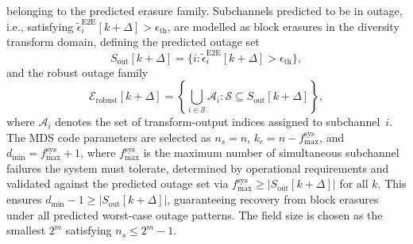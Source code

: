 \documentclass[lettersize,journal]{IEEEtran}
\begin{document}
belonging to the predicted erasure family. Subchannels predicted to 
be in outage, i.e., satisfying 
$\tilde{\epsilon}_{i}^{\mathrm{E2E}}[k+\Delta] > \epsilon_{\mathrm{th}}$, 
are modelled as block erasures in the diversity transform domain, 
defining the predicted outage set
\begin{equation}
S_{\mathrm{out}}[k+\Delta] = \bigl\{i : 
\tilde{\epsilon}_{i}^{\mathrm{E2E}}[k+\Delta] > 
\epsilon_{\mathrm{th}}\bigr\},
\label{eq:outage_set}
\end{equation}
and the robust outage family
\begin{equation}
\mathcal{E}_{\mathrm{robust}}[k+\Delta] = \left\{ 
\bigcup_{i\in \mathcal{S}} \mathcal{A}_i : 
\mathcal{S} \subseteq S_{\mathrm{out}}[k+\Delta] \right\},
\label{eq:erasure_pattern}
\end{equation}
where $\mathcal{A}_i$ denotes the set of transform-output indices 
assigned to subchannel~$i$. The MDS code parameters are selected as $n_s = n$, $k_c = n - f_{\mathrm{max}}^{\mathrm{sys}}$, and 
$d_{\min} = f_{\mathrm{max}}^{\mathrm{sys}} + 1$, where 
$f_{\mathrm{max}}^{\mathrm{sys}}$ is the maximum number of 
simultaneous subchannel failures the system must tolerate, 
determined by operational requirements and validated against 
the predicted outage set via 
$f_{\mathrm{max}}^{\mathrm{sys}} \geq |S_{\mathrm{out}}[k+\Delta]|$ 
for all $k$. This ensures $d_{\min} - 1 \geq |S_{\mathrm{out}}[k+\Delta]|$, 
guaranteeing recovery from block erasures under all predicted worst-case outage patterns. The field size is chosen as the smallest $2^m$ 
satisfying $n_s \leq 2^m - 1$.
\end{document}
